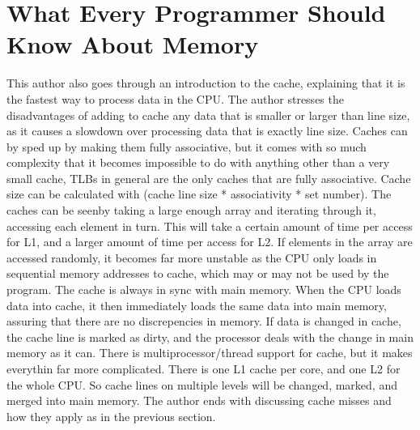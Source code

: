\documentclass[letterpaper,10pt,titlepage]{article}
\begin{document}
\pagebreak

\section{What Every Programmer Should Know About Memory}
This author also goes through an introduction to the cache, explaining that it is the fastest way to process data in the CPU. 
    The author stresses the disadvantages of adding to cache any data that is smaller or larger than line size, as it causes a slowdown
    over processing data that is exactly line size. Caches can by sped up by making them fully associative, but it comes with so much complexity 
    that it becomes impossible to do with anything other than a very small cache, TLBs in general are the only caches that are fully 
    associative. Cache size can be calculated with (cache line size * associativity * set number). The caches can be seenby taking a large 
    enough array and iterating through it, accessing each element in turn. This will take a certain amount of time per access for L1, and a 
    larger amount of time per access for L2. If elements in the array are accessed randomly, it becomes far more unstable as the 
    CPU only loads in sequential memory addresses to cache, which may or may not be used by the program. The cache is always in sync with 
    main memory. When the CPU loads data into cache, it then immediately loads the same data into main memory, assuring that there are no 
    discrepencies in memory. If data is changed in cache, the cache line is marked as dirty, and the processor deals with the change in main 
    memory as it can. There is multiprocessor/thread support for cache, but it makes everythin far more complicated. There is one L1 cache 
    per core, and one L2 for the whole CPU. So cache lines on multiple levels will be changed, marked, and merged into main memory. The author 
    ends with discussing cache misses and how they apply as in the previous section. 
    
\pagebreak
\end{document}
